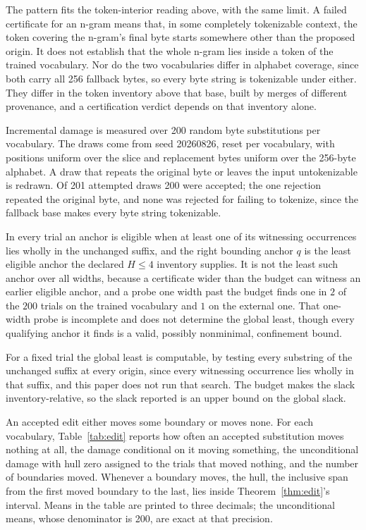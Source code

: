 \documentclass[11pt,a4paper]{article}
\theoremstyle{definition}
\theoremstyle{plain}
\begin{document}
The pattern fits the token-interior reading above, with the same limit. A failed certificate for an n-gram means that,
in some completely tokenizable context, the token covering the n-gram's final byte starts somewhere other than the
proposed origin. It does not establish that the whole n-gram lies inside a token of the trained vocabulary. Nor do the
two vocabularies differ in alphabet coverage, since both carry all 256 fallback bytes, so every byte string is
tokenizable under either. They differ in the token inventory above that base, built by merges of different provenance,
and a certification verdict depends on that inventory alone.

Incremental damage is measured over 200 random byte substitutions per vocabulary. The draws come from seed 20260826,
reset per vocabulary, with positions uniform over the slice and replacement bytes uniform over the 256-byte alphabet. A
draw that repeats the original byte or leaves the input untokenizable is redrawn. Of 201 attempted draws 200 were
accepted; the one rejection repeated the original byte, and none was rejected for failing to tokenize, since the
fallback base makes every byte string tokenizable.

In every trial an anchor is eligible when at least one of its witnessing occurrences lies wholly in the unchanged
suffix, and the right bounding anchor $q$ is the least eligible anchor the declared $H \le 4$ inventory supplies. It is
not the least such anchor over all widths, because a certificate wider than the budget can witness an earlier eligible
anchor, and a probe one width past the budget finds one in $2$ of the $200$ trials on the trained vocabulary and $1$ on
the external one. That one-width probe is incomplete and does not determine the global least, though every qualifying
anchor it finds is a valid, possibly nonminimal, confinement bound.

For a fixed trial the global least is computable, by testing every substring of the unchanged suffix at every origin,
since every witnessing occurrence lies wholly in that suffix, and this paper does not run that search. The budget makes
the slack inventory-relative, so the slack reported is an upper bound on the global slack.

An accepted edit either moves some boundary or moves none. For each vocabulary, Table~\ref{tab:edit} reports how often
an accepted substitution moves nothing at all, the damage conditional on it moving something, the unconditional damage
with hull zero assigned to the trials that moved nothing, and the number of boundaries moved. Whenever a boundary moves,
the hull, the inclusive span from the first moved boundary to the last, lies inside Theorem~\ref{thm:edit}'s interval.
Means in the table are printed to three decimals; the unconditional means, whose denominator is 200, are exact at that
precision.
\end{document}
